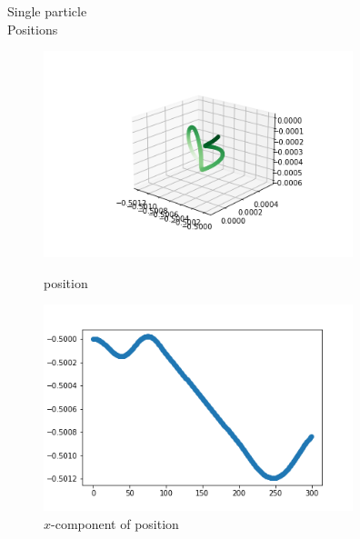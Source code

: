 \documentclass[12pt]{article}
\begin{document}
	Single particle \\
	Positions 
	\begin{figure}[H]
		\begin{multicols}{2}
			\includegraphics[width=\linewidth, height=6cm]{ps2.png} \caption{position} \label{ps2} \par
			\includegraphics[width=\linewidth, height=6cm]{psx2.png} \caption{$x$-component of position} \label{psx2} \par
		\end{multicols}
	\end{figure}
\end{document}
